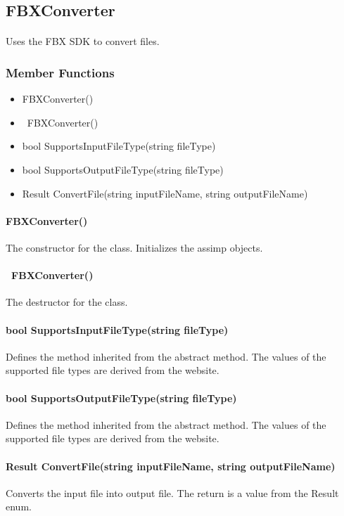 \hypertarget{fileconversion_fbxconverter}
{
    \label{fileconversion_fbxconverter}
}

\subsection{FBXConverter}
    \paragraph{}
        Uses the FBX SDK to convert files.

    \subsubsection{Member Functions}

        \begin{itemize}
            \item FBXConverter()
            \item ~FBXConverter()
            \item bool SupportsInputFileType(string fileType)
            \item bool SupportsOutputFileType(string fileType)
            \item Result ConvertFile(string inputFileName, string outputFileName)
        \end{itemize}

        \paragraph{FBXConverter()}
            \hfill \break
            The constructor for the class. Initializes the assimp objects.   
        
        \paragraph{~FBXConverter()}
            \hfill \break
            The destructor for the class.

        \paragraph{bool SupportsInputFileType(string fileType)}
            \hfill \break
            Defines the method inherited from the abstract method.  The values of the supported file types are derived from the website.

        \paragraph{bool SupportsOutputFileType(string fileType)}
            \hfill \break
            Defines the method inherited from the abstract method.  The values of the supported file types are derived from the website.

        \paragraph{Result ConvertFile(string inputFileName, string outputFileName)}
            \hfill \break
            Converts the input file into output file.  The return is a value from the Result enum.
        
        